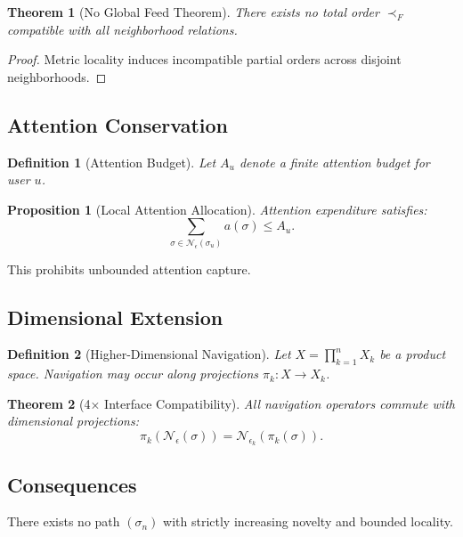 \documentclass[11pt]{article}
\newtheorem{definition}{Definition}
\newtheorem{proposition}{Proposition}
\newtheorem{theorem}{Theorem}
\begin{document}
\begin{theorem}[No Global Feed Theorem]
There exists no total order $\prec_F$ compatible with all neighborhood relations.
\end{theorem}

\begin{proof}
Metric locality induces incompatible partial orders across disjoint neighborhoods.
\end{proof}

\subsection{Attention Conservation}

\begin{definition}[Attention Budget]
Let $A_u$ denote a finite attention budget for user $u$.
\end{definition}

\begin{proposition}[Local Attention Allocation]
Attention expenditure satisfies:
\[
\sum_{\sigma \in \mathcal{N}_\epsilon(\sigma_u)} a(\sigma) \le A_u.
\]
\end{proposition}

This prohibits unbounded attention capture.

\subsection{Dimensional Extension}

\begin{definition}[Higher-Dimensional Navigation]
Let $X = \prod_{k=1}^n X_k$ be a product space. Navigation may occur along projections
$\pi_k : X \to X_k$.
\end{definition}

\begin{theorem}[4× Interface Compatibility]
All navigation operators commute with dimensional projections:
\[
\pi_k(\mathcal{N}_\epsilon(\sigma)) = \mathcal{N}_{\epsilon_k}(\pi_k(\sigma)).
\]
\end{theorem}

\subsection{Consequences}

\begin{corollary}
There exists no path $(\sigma_n)$ with strictly increasing novelty and bounded locality.
\end{corollary}
\end{document}
